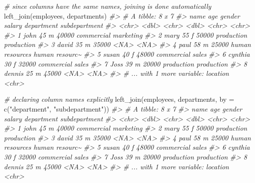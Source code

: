 \documentclass[
]{book}
\newenvironment{Shaded}{\begin{snugshade}}{\end{snugshade}}
\newcommand{\AttributeTok}[1]{\textcolor[rgb]{0.77,0.63,0.00}{#1}}
\newcommand{\CommentTok}[1]{\textcolor[rgb]{0.56,0.35,0.01}{\textit{#1}}}
\newcommand{\FunctionTok}[1]{\textcolor[rgb]{0.00,0.00,0.00}{#1}}
\newcommand{\NormalTok}[1]{#1}
\newcommand{\StringTok}[1]{\textcolor[rgb]{0.31,0.60,0.02}{#1}}
\begin{document}
\begin{Shaded}
\begin{Highlighting}[]
\CommentTok{\# since columns have the same names, joining is done automatically}
\FunctionTok{left\_join}\NormalTok{(employees, departments)}
\CommentTok{\#\textgreater{} \# A tibble: 8 x 7}
\CommentTok{\#\textgreater{}   name      age gender salary department      subdepartment }
\CommentTok{\#\textgreater{}   \textless{}chr\textgreater{}   \textless{}dbl\textgreater{} \textless{}chr\textgreater{}   \textless{}dbl\textgreater{} \textless{}chr\textgreater{}           \textless{}chr\textgreater{}         }
\CommentTok{\#\textgreater{} 1 john       45 m       40000 commercial      marketing     }
\CommentTok{\#\textgreater{} 2 mary       55 f       50000 production      production    }
\CommentTok{\#\textgreater{} 3 david      35 m       35000 \textless{}NA\textgreater{}            \textless{}NA\textgreater{}          }
\CommentTok{\#\textgreater{} 4 paul       58 m       25000 human resources human resourc\textasciitilde{}}
\CommentTok{\#\textgreater{} 5 susan      40 f       48000 commercial      sales         }
\CommentTok{\#\textgreater{} 6 cynthia    30 f       32000 commercial      sales         }
\CommentTok{\#\textgreater{} 7 Joss       39 m       20000 production      production    }
\CommentTok{\#\textgreater{} 8 dennis     25 m       45000 \textless{}NA\textgreater{}            \textless{}NA\textgreater{}          }
\CommentTok{\#\textgreater{} \# ... with 1 more variable: location \textless{}chr\textgreater{}}


\CommentTok{\# declaring column names explicitly}
\FunctionTok{left\_join}\NormalTok{(employees, departments, }\AttributeTok{by =} \FunctionTok{c}\NormalTok{(}\StringTok{"department"}\NormalTok{, }\StringTok{"subdepartment"}\NormalTok{))}
\CommentTok{\#\textgreater{} \# A tibble: 8 x 7}
\CommentTok{\#\textgreater{}   name      age gender salary department      subdepartment }
\CommentTok{\#\textgreater{}   \textless{}chr\textgreater{}   \textless{}dbl\textgreater{} \textless{}chr\textgreater{}   \textless{}dbl\textgreater{} \textless{}chr\textgreater{}           \textless{}chr\textgreater{}         }
\CommentTok{\#\textgreater{} 1 john       45 m       40000 commercial      marketing     }
\CommentTok{\#\textgreater{} 2 mary       55 f       50000 production      production    }
\CommentTok{\#\textgreater{} 3 david      35 m       35000 \textless{}NA\textgreater{}            \textless{}NA\textgreater{}          }
\CommentTok{\#\textgreater{} 4 paul       58 m       25000 human resources human resourc\textasciitilde{}}
\CommentTok{\#\textgreater{} 5 susan      40 f       48000 commercial      sales         }
\CommentTok{\#\textgreater{} 6 cynthia    30 f       32000 commercial      sales         }
\CommentTok{\#\textgreater{} 7 Joss       39 m       20000 production      production    }
\CommentTok{\#\textgreater{} 8 dennis     25 m       45000 \textless{}NA\textgreater{}            \textless{}NA\textgreater{}          }
\CommentTok{\#\textgreater{} \# ... with 1 more variable: location \textless{}chr\textgreater{}}


\end{Highlighting}
\end{Shaded}
\end{document}
